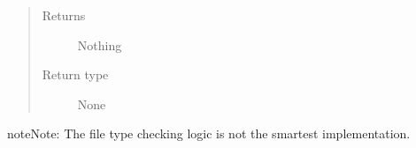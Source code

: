 \documentclass[letterpaper,10pt,english]{sphinxmanual}
\begin{document}
\begin{fulllineitems}
\begin{quote}
\begin{description}
\begin{itemize}
\end{itemize}

\item[{Returns}] \leavevmode
{} \textendash{} Nothing

\item[{Return type}] \leavevmode
None

\end{description}\end{quote}

\begin{sphinxadmonition}{note}{Note:}
The file type checking logic is not the smartest implementation.
\end{sphinxadmonition}

\end{fulllineitems}

\end{document}
